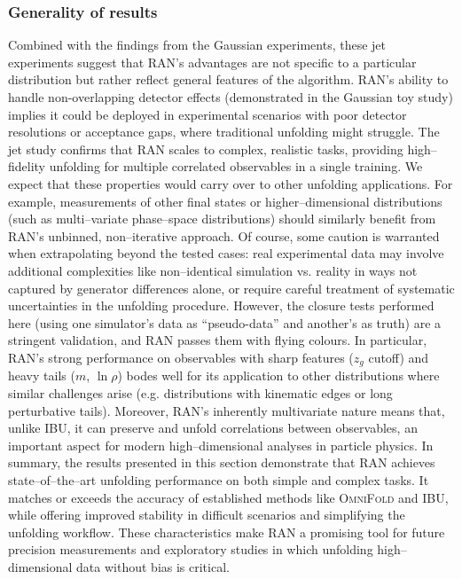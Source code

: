     \subsubsection{Generality of results}
    Combined with the findings from the Gaussian experiments, these jet experiments suggest that RAN’s advantages are not specific to a particular distribution but rather reflect general features of the algorithm.
    RAN’s ability to handle non-overlapping detector effects (demonstrated in the Gaussian toy study) implies it could be deployed in experimental scenarios with poor detector resolutions or acceptance gaps, where traditional unfolding might struggle.
    The jet study confirms that RAN scales to complex, realistic tasks, providing high--fidelity unfolding for multiple correlated observables in a single training.
    We expect that these properties would carry over to other unfolding applications.
    For example, measurements of other final states or higher--dimensional distributions (such as multi--variate phase--space distributions) should similarly benefit from RAN’s unbinned, non--iterative approach.
    Of course, some caution is warranted when extrapolating beyond the tested cases: real experimental data may involve additional complexities like non--identical simulation vs. reality in ways not captured by generator differences alone, or require careful treatment of systematic uncertainties in the unfolding procedure.
    However, the closure tests performed here (using one simulator’s data as “pseudo-data” and another’s as truth) are a stringent validation, and RAN passes them with flying colours.
    In particular, RAN’s strong performance on observables with sharp features ($z_g$ cutoff) and heavy tails ($m$, $\ln\rho$) bodes well for its application to other distributions where similar challenges arise (e.g. distributions with kinematic edges or long perturbative tails).
    Moreover, RAN’s inherently multivariate nature means that, unlike IBU, it can preserve and unfold correlations between observables, an important aspect for modern high--dimensional analyses in particle physics.
    In summary, the results presented in this section demonstrate that RAN achieves state--of--the--art unfolding performance on both simple and complex tasks.
    It matches or exceeds the accuracy of established methods like \textsc{OmniFold} and IBU, while offering improved stability in difficult scenarios and simplifying the unfolding workflow.
    These characteristics make RAN a promising tool for future precision measurements and exploratory studies in which unfolding high--dimensional data without bias is critical.